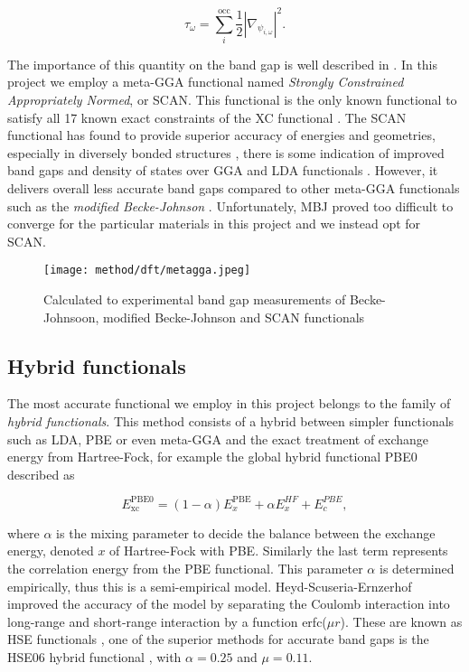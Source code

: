 \begin{equation}
	\tau_\omega = \sum_i ^\text{occ}\frac{1}{2}|\nabla_{\psi_{i, \omega}}|^2.
\end{equation}

The importance of this quantity on the band gap is well described in \cite{xc_kineticEnergy}. In this project we employ a meta-GGA functional named \textit{Strongly Constrained Appropriately Normed}, or SCAN. This functional is the only known functional to satisfy all 17 known exact constraints of the XC functional \cite{scan}. The SCAN functional has found to provide superior accuracy of energies and geometries, especially in diversely bonded structures \cite{scan_divbond}, there is some indication of improved band gaps and density of states over GGA and LDA functionals \cite{scan_pbe}. However, it delivers overall less accurate band gaps compared to other meta-GGA functionals such as the \textit{modified Becke-Johnson} \cite{mbj}. Unfortunately, MBJ proved too difficult to converge for the particular materials in this project and we instead opt for SCAN. 
\begin{figure}[H]
\centering
\texttt{[image: method/dft/metagga.jpeg]}
\caption{Calculated to experimental band gap measurements of Becke-Johnsoon, modified Becke-Johnson and SCAN functionals \cite{xc_benchmark}}
\end{figure}

\subsection{Hybrid functionals}

The most accurate functional we employ in this project belongs to the family of \textit{hybrid functionals}. This method consists of a hybrid between simpler functionals such as LDA, PBE or even meta-GGA and the exact treatment of exchange energy from Hartree-Fock, for example the global hybrid functional PBE0 \cite{pbe0} described as

\begin{equation}
E_\text{xc} ^\text{PBE0} = (1-\alpha)E_x ^\text{PBE} + \alpha E_x ^{HF} + E_c ^{PBE}, 
\end{equation}

 where $\alpha$ is the mixing parameter to decide the balance between the exchange energy, denoted $x$ of Hartree-Fock with PBE. Similarly the last term represents the correlation energy from the PBE functional. This parameter $\alpha$ is determined empirically, thus this is a semi-empirical model. Heyd-Scuseria-Ernzerhof improved the accuracy of the model by separating the Coulomb interaction into long-range and short-range interaction by a function erfc($\mu r$). These are known as HSE functionals \cite{hse}, one of the superior methods for accurate band gaps is the HSE06 hybrid functional \cite{hse06}, with $\alpha = 0.25$ and $\mu = 0.11$.  
 
